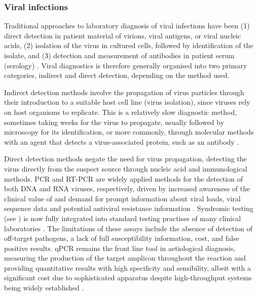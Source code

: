 \subsubsection{Viral infections} \label{sssec:_intro_viral}

Traditional approaches to laboratory diagnosis of viral infections have been (1) direct detection in patient material of virions, viral antigens, or viral nucleic acids, (2) isolation of the virus in cultured cells, followed by identification of the isolate, and (3) detection and measurement of antibodies in patient serum (serology) \citep{burrell_laboratory_2017}. 
Viral diagnostics is therefore generally organised into two primary categories, indirect and direct detection, depending on the method used. 

Indirect detection methods involve the propagation of virus particles through their introduction to a suitable host cell line (virus isolation), since viruses rely on host organisms to replicate. 
This is a relatively slow diagnostic method, sometimes taking weeks for the virus to propagate, usually followed by microscopy for its identification, or more commonly, through molecular methods with an agent that detects a virus-associated protein, such as an antibody \citep{cassedy_virus_2021}. 

Direct detection methods negate the need for virus propagation, detecting the virus directly from the suspect source through nucleic acid and immunological methods. 
\ac{PCR} and \ac{RT-PCR} are widely applied methods for the detection of both DNA and RNA viruses, respectively, driven by increased awareness of the clinical value of and demand for prompt information about viral loads, viral sequence data and potential antiviral resistance information \citep{cassedy_virus_2021}. 
Syndromic testing (see ) is now fully integrated into standard testing practises of many clinical laboratories \citep{dien_bard_panels_2020}. 
The limitations of these assays include the absence of detection of off-target pathogens, a lack of full susceptibility information, cost, and false positive results. 
\ac{qPCR} remains the front line tool in aetiological diagnosis, measuring the production of the target amplicon throughout the reaction and providing quantitative results with high specificity and sensibility, albeit with a significant cost due to sophisticated apparatus despite high-throughput systems being widely established \citep{cassedy_virus_2021}.

